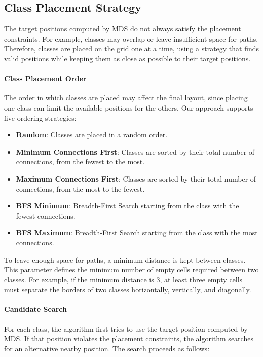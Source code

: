 \documentclass[../../main.tex]{subfiles}
\begin{document}
\subsection{Class Placement Strategy}

The target positions computed by MDS do not always satisfy the placement constraints. For example, classes may overlap or leave insufficient space for paths. Therefore, classes are placed on the grid one at a time, using a strategy that finds valid positions while keeping them as close as possible to their target positions.

\paragraph{Class Placement Order}

The order in which classes are placed may affect the final layout, since placing one class can limit the available positions for the others. Our approach supports five ordering strategies:

\begin{itemize}
    \item \textbf{Random}: Classes are placed in a random order.
    \item \textbf{Minimum Connections First}: Classes are sorted by their total number of connections, from the fewest to the most.
    \item \textbf{Maximum Connections First}: Classes are sorted by their total number of connections, from the most to the fewest.
    \item \textbf{BFS Minimum}: Breadth-First Search starting from the class with the fewest connections.
    \item \textbf{BFS Maximum}: Breadth-First Search starting from the class with the most connections.
\end{itemize}

To leave enough space for paths, a minimum distance is kept between classes. This parameter defines the minimum number of empty cells required between two classes. For example, if the minimum distance is $3$, at least three empty cells must separate the borders of two classes horizontally, vertically, and diagonally. 

\paragraph{Candidate Search}

For each class, the algorithm first tries to use the target position computed by MDS. If that position violates the placement constraints, the algorithm searches for an alternative nearby position. The search proceeds as follows:
\end{document}
